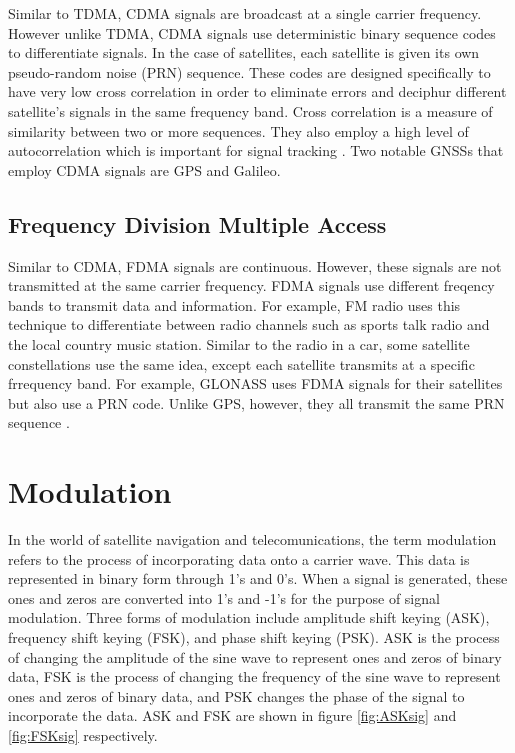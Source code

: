\documentclass[12pt]{report}
\begin{document}
Similar to TDMA, CDMA signals are broadcast at a single carrier frequency. However unlike TDMA, CDMA signals use deterministic binary sequence codes to differentiate signals. In the case of satellites, each satellite is given its own pseudo-random noise (PRN) sequence. These codes are designed specifically to have very low cross correlation in order to eliminate errors and deciphur different satellite's signals in the same frequency band. Cross correlation is a measure of similarity between two or more sequences. They also employ a high level of autocorrelation which is important for signal tracking \cite{goldOptimalBinarySequences1967}. Two notable GNSSs that employ CDMA signals are GPS and Galileo.

\subsection{Frequency Division Multiple Access}

Similar to CDMA, FDMA signals are continuous. However, these signals are not transmitted at the same carrier frequency. FDMA signals use different freqency bands to transmit data and information. For example, FM radio uses this technique to differentiate between radio channels such as sports talk radio and the local country music station. Similar to the radio in a car, some satellite constellations use the same idea, except each satellite transmits at a specific frrequency band. For example, GLONASS uses FDMA signals for their satellites but also use a PRN code. Unlike GPS, however, they all transmit the same PRN sequence \cite{GLONASSSignalPlan}. 

\section{Modulation}
In the world of satellite navigation and telecomunications, the term modulation refers to the process of incorporating data onto a carrier wave. This data is represented in binary form through 1's and 0's. When a signal is generated, these ones and zeros are converted into 1's and -1's for the purpose of signal modulation. Three forms of modulation include amplitude shift keying (ASK), frequency shift keying (FSK), and phase shift keying (PSK). ASK is the process of changing the amplitude of the sine wave to represent ones and zeros of binary data, FSK is the process of changing the frequency of the sine wave to represent ones and zeros of binary data, and PSK changes the phase of the signal to incorporate the data. ASK and FSK are shown in figure \ref{fig:ASKsig} and \ref{fig:FSKsig} respectively.
\end{document}
